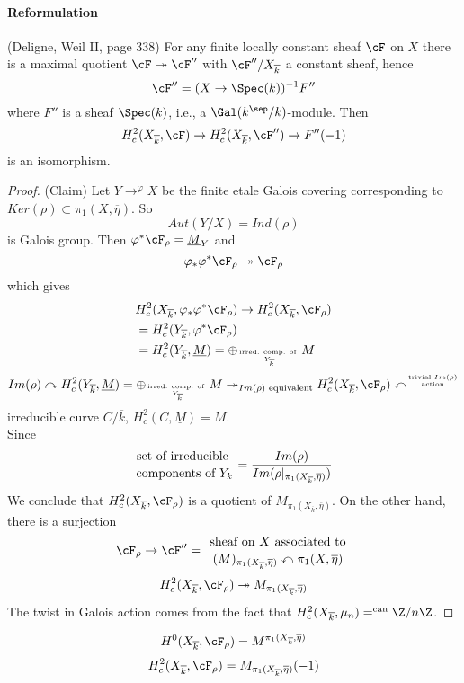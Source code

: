 \paragraph{Reformulation} (Deligne, Weil II, page 338) For any finite locally constant sheaf $\cF$ on $X$ there is a maximal quotient $\cF\twoheadrightarrow \cF''$ with $\cF''/X_{\overline k}$ a constant sheaf, hence 
	$$\cF'' = (X\to \Spec(k))^{-1}F''$$
	where $F''$ is a sheaf $\Spec(k)$, i.e., a $\Gal(k^{\sep}/k)$-module. Then
	$$H_c^2(X_{\overline k}, \cF)\to H_c^2(X_{\overline k}, \cF'')\to F''(-1)$$
	is an isomorphism. 
\begin{proof}(Claim) Let $Y\to^{\varphi}X$ be the finite etale Galois covering corresponding to $Ker(\rho)\subset \pi_1(X, \overline\eta)$. So 
	$$Aut(Y/X)=Ind(\rho)$$
	is Galois group. Then $\varphi^*\cF_\rho =\underline M_Y$ and
		$$\varphi_*\varphi^*\cF_\rho\twoheadrightarrow \cF_\rho$$
		which gives
		\begin{align*}
		&H_c^2(X_{\overline k}, \varphi_*\varphi^*\cF_\rho) \to H_c^2(X_{\overline k}, \cF_\rho)\\
		&=H_c^2(Y_{\overline k}, \varphi^*\cF_\rho)\\
		&=H_c^2(Y_{\overline k}, \underline M) = \oplus_{\text{irred. comp. of }\atop Y_{\overline k}}M
		\end{align*}
		$$Im(\rho)\curvearrowright H_c^2(Y_{\overline k}, \underline M) = \oplus_{\text{irred. comp. of }\atop Y_{\overline k}}M\twoheadrightarrow_{Im(\rho)\text{ equivalent}} H_c^2(X_{\overline k}, \cF_{\rho})\curvearrowleft^{\text{trivial }Im(\rho)\atop \text{action}}$$
		irreducible curve $C/\overline k$, $H_c^2(C, \underline M)=M$. \\
Since
	$${\text{set of irreducible }\atop\text{components of }Y_k} = \frac{Im(\rho)}{Im(\rho|_{\pi_1(X_{\overline k}, \overline \eta)})}$$
	We conclude that $H_c^2(X_{\overline k}, \cF_\rho)$ is a quotient of $M_{\pi_1(X_{\overline k}, \overline \eta)}$. On the other hand, there is a surjection
		$$\cF_\rho\to \cF'' = {\text{ sheaf on } X\text{ associated to }\atop (M)_{\pi_1(X_{\overline k}, \overline \eta)}\curvearrowleft\pi_1(X, \overline \eta)}$$
			$$H_c^2(X_{\overline k}, \cF_\rho)\twoheadrightarrow M_{\pi_1(X_{\overline k}, \overline\eta)}$$
			The twist in Galois action comes from the fact that $H_c^2(X_{\overline k}, \mu_n)=^{\text{can}} \Z/n\Z$. 
\end{proof}
	$$H^0(X_{\overline k}, \cF_\rho) = M^{\pi_1(X_{\overline k}, \overline\eta)}$$
	$$H_c^2(X_{\overline k}, \cF_\rho) = M_{\pi_1(X_{\overline k}, \overline \eta)}(-1)$$
	
